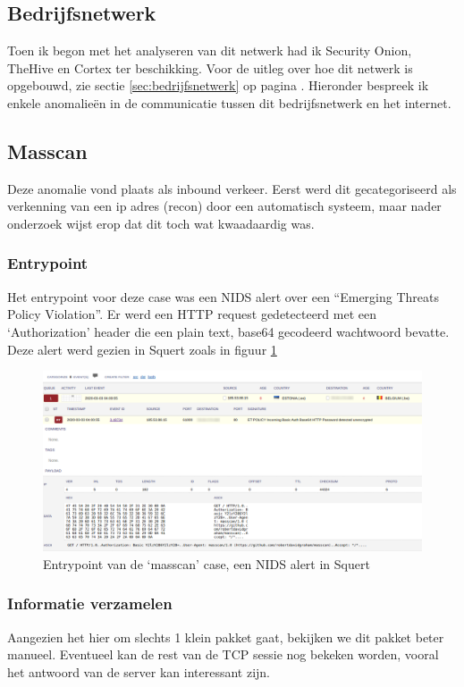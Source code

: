 \documentclass[a4paper,12pt]{report}
\begin{document}
\subsection{Bedrijfsnetwerk}
Toen ik begon met het analyseren van dit netwerk had ik Security Onion, TheHive en Cortex ter beschikking.
Voor de uitleg over hoe dit netwerk is opgebouwd, zie sectie \ref{sec:bedrijfsnetwerk} op pagina \pageref{sec:bedrijfsnetwerk}.
Hieronder bespreek ik enkele anomalieën in de communicatie tussen dit bedrijfsnetwerk en het internet.

\subsection{Masscan}
Deze anomalie vond plaats als inbound verkeer.
Eerst werd dit gecategoriseerd als verkenning van een ip adres (recon) door een automatisch systeem, maar nader onderzoek wijst erop dat dit toch wat kwaadaardig was.

\subsubsection{Entrypoint}
Het entrypoint voor deze case was een NIDS alert over een ``Emerging Threats Policy Violation''.
Er werd een HTTP request gedetecteerd met een `Authorization' header die een plain text, base64 gecodeerd wachtwoord bevatte.
Deze alert werd gezien in Squert zoals in figuur \ref{fig:analyse-masscan-entrypoint}

\begin{figure}[H]
  \centering
  \includegraphics[width=\textwidth]{analyse-masscan-entrypoint}
  \caption{Entrypoint van de `masscan' case, een NIDS alert in Squert}
  \label{fig:analyse-masscan-entrypoint}
\end{figure}


\subsubsection{Informatie verzamelen}
Aangezien het hier om slechts 1 klein pakket gaat, bekijken we dit pakket beter manueel.
Eventueel kan de rest van de TCP sessie nog bekeken worden, vooral het antwoord van de server kan interessant zijn.
\end{document}
